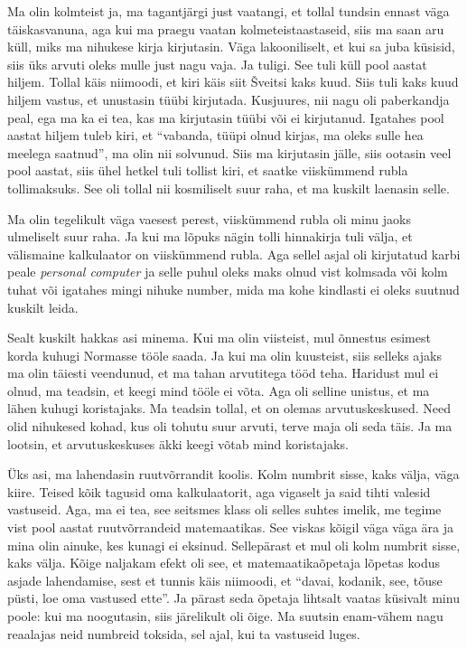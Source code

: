 Ma olin kolmteist ja, ma  tagantjärgi just vaatangi, et tollal tundsin ennast väga täiskasvanuna, aga kui ma praegu vaatan kolmeteistaastaseid, siis ma saan aru küll, miks ma nihukese kirja kirjutasin. Väga lakooniliselt, et kui sa juba küsisid, siis üks arvuti oleks mulle just nagu vaja. Ja tuligi. See tuli küll pool aastat hiljem. Tollal käis niimoodi, et kiri käis siit Šveitsi kaks kuud. Siis tuli kaks kuud hiljem vastus, et unustasin tüübi kirjutada. Kusjuures, nii nagu oli paberkandja peal, ega ma ka ei tea, kas ma kirjutasin tüübi või ei kirjutanud. Igatahes pool aastat hiljem tuleb kiri, et \enquote{vabanda, tüüpi olnud kirjas, ma oleks sulle hea meelega saatnud}, ma olin nii solvunud. Siis ma kirjutasin jälle, siis ootasin veel pool aastat, siis ühel hetkel tuli tollist kiri, et  saatke viiskümmend rubla tollimaksuks. See oli tollal nii kosmiliselt suur raha, et ma kuskilt laenasin selle. 


Ma olin tegelikult väga vaesest perest, viiskümmend rubla oli minu jaoks ulmeliselt suur raha. Ja kui ma lõpuks nägin tolli hinnakirja tuli välja, et välismaine kalkulaator on viiskümmend rubla. Aga sellel asjal oli kirjutatud karbi peale \emph{personal computer} ja selle puhul oleks maks olnud vist kolmsada või kolm tuhat või igatahes mingi nihuke number, mida ma kohe kindlasti ei oleks suutnud kuskilt leida. 

Sealt kuskilt hakkas asi minema. Kui ma olin viisteist,  mul õnnestus esimest korda kuhugi Normasse tööle saada. Ja kui ma olin kuusteist, siis selleks ajaks ma olin täiesti veendunud, et ma tahan arvutitega tööd teha. Haridust mul ei olnud, ma teadsin, et keegi mind tööle ei võta. Aga oli selline unistus, et ma lähen kuhugi koristajaks. Ma teadsin tollal, et on olemas arvutuskeskused. Need olid nihukesed kohad, kus oli tohutu suur arvuti, terve maja oli seda täis. Ja ma lootsin, et arvutuskeskuses äkki keegi võtab mind koristajaks. 


Üks asi, ma lahendasin ruutvõrrandit koolis. Kolm numbrit sisse, kaks välja, väga kiire. Teised kõik tagusid oma kalkulaatorit, aga vigaselt ja said tihti valesid vastuseid. Aga, ma ei tea, see seitsmes klass oli selles suhtes imelik, me tegime vist pool aastat ruutvõrrandeid matemaatikas. See viskas kõigil  väga väga ära ja mina olin ainuke, kes kunagi ei eksinud. Sellepärast et mul oli kolm numbrit sisse, kaks välja. Kõige naljakam efekt oli see, et matemaatikaõpetaja lõpetas kodus asjade lahendamise, sest et tunnis käis niimoodi, et \enquote{davai, kodanik, see, tõuse püsti, loe oma vastused ette}. Ja pärast seda õpetaja lihtsalt vaatas küsivalt minu poole: kui ma noogutasin, siis  järelikult oli õige. Ma suutsin enam-vähem nagu reaalajas neid numbreid toksida, sel ajal, kui ta vastuseid luges. 

